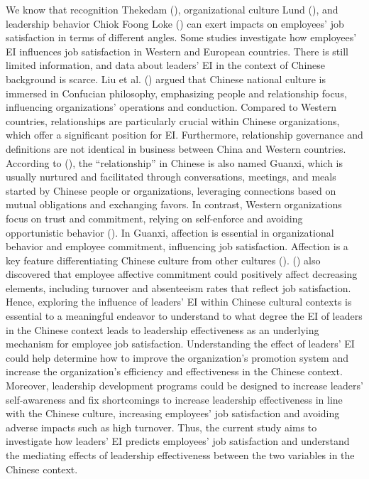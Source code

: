 \documentclass[
  man,
  longtable,
  nolmodern,
  notxfonts,
  notimes,
  colorlinks=true,linkcolor=blue,citecolor=blue,urlcolor=blue]{apa7}
\begin{document}
We know that recognition Thekedam (),
organizational culture Lund (), and
leadership behavior Chiok Foong Loke
() can exert impacts on
employees' job satisfaction in terms of different angles. Some studies
investigate how employees' EI influences job satisfaction in Western and
European countries. There is still limited information, and data about
leaders' EI in the context of Chinese background is scarce. Liu et al.
() argued that Chinese national culture is
immersed in Confucian philosophy, emphasizing people and relationship
focus, influencing organizations' operations and conduction. Compared to
Western countries, relationships are particularly crucial within Chinese
organizations, which offer a significant position for EI. Furthermore,
relationship governance and definitions are not identical in business
between China and Western countries. According to
(), the ``relationship'' in
Chinese is also named Guanxi, which is usually nurtured and facilitated
through conversations, meetings, and meals started by Chinese people or
organizations, leveraging connections based on mutual obligations and
exchanging favors. In contrast, Western organizations focus on trust and
commitment, relying on self-enforce and avoiding opportunistic behavior
(). In Guanxi, affection is
essential in organizational behavior and employee commitment,
influencing job satisfaction. Affection is a key feature differentiating
Chinese culture from other cultures
().
() also discovered that employee
affective commitment could positively affect decreasing elements,
including turnover and absenteeism rates that reflect job satisfaction.
Hence, exploring the influence of leaders' EI within Chinese cultural
contexts is essential to a meaningful endeavor to understand to what
degree the EI of leaders in the Chinese context leads to leadership
effectiveness as an underlying mechanism for employee job satisfaction.
Understanding the effect of leaders' EI could help determine how to
improve the organization's promotion system and increase the
organization's efficiency and effectiveness in the Chinese context.
Moreover, leadership development programs could be designed to increase
leaders' self-awareness and fix shortcomings to increase leadership
effectiveness in line with the Chinese culture, increasing employees'
job satisfaction and avoiding adverse impacts such as high turnover.
Thus, the current study aims to investigate how leaders' EI predicts
employees' job satisfaction and understand the mediating effects of
leadership effectiveness between the two variables in the Chinese
context.
\end{document}
